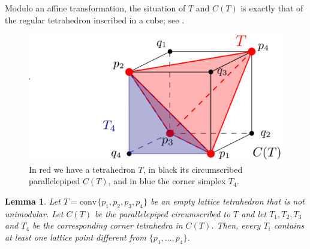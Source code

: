 \documentclass{amsart}
\theoremstyle{plain}
\newtheorem{lemma}[theorem]{Lemma}
\theoremstyle{definition}
\newcommand{\conv}{\ensuremath{\mathrm{conv}}\hspace{1pt}}
\begin{document}
Modulo an affine transformation, the situation of $T$ and $C(T)$ is exactly that of the regular tetrahedron inscribed in a cube; see . 
%
\begin{figure}[htb]
\includegraphics[scale=.25]{circumscribed_parall}
\caption{In red we have a tetrahedron $T$, in black its circumscribed parallelepiped $C(T)$, and in blue the corner simplex $T_4$.}
\label{fig:circumscribed_parall}
\end{figure}

\begin{lemma}
\label{lemma:corner}
Let $T=\conv\{p_1,p_2,p_3,p_4\}$ be an empty lattice tetrahedron that is not unimodular. Let $C(T)$ be the parallelepiped circumscribed to $T$ and let $T_1, T_2,T_3$ and $T_4$ be the corresponding corner tetrahedra in $C(T)$. Then, every $T_i$ contains at least one lattice point different from $\{p_1,\dots,p_4\}$.
\end{lemma}
\end{document}
